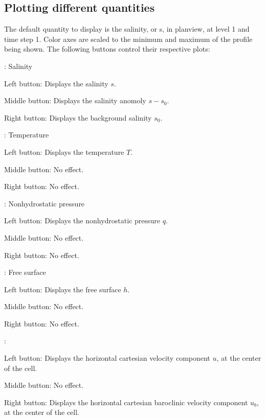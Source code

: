 \documentclass[12pt,oneside]{article}
\begin{document}
\subsection{Plotting different quantities}

The default quantity to display is the salinity, or s, in planview, at level 1 and time step 1.  Color axes
are scaled to the minimum and maximum of the profile being shown.  The following
buttons control their respective plots:
\begin{list}{}
\item {}: Salinity
\begin{list}{}
\item Left button: Displays the salinity $s$.
\item Middle button: Displays the salinity anomoly $s-s_0$.
\item Right button: Displays the background salinity $s_0$.
\end{list}
\item {}: Temperature
\begin{list}{}
\item Left button: Displays the temperature $T$.
\item Middle button: No effect.
\item Right button: No effect.
\end{list}
\item {}: Nonhydrostatic pressure
\begin{list}{}
\item Left button: Displays the nonhydrostatic pressure $q$.
\item Middle button: No effect.
\item Right button: No effect.
\end{list}
\item {}: Free surface
\begin{list}{}
\item Left button: Displays the free surface $h$.
\item Middle button: No effect.
\item Right button: No effect.
\end{list}
\item {}: 
\begin{list}{}
\item Left button: Displays the horizontal cartesian velocity component $u$, at the center of the cell.
\item Middle button: No effect.
\item Right button: Displays the horizontal cartesian baroclinic velocity component $u_b$, at the center of the cell.

\end{list}
\end{list}
\end{document}
